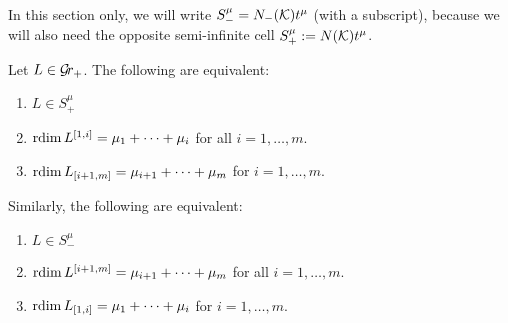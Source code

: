 \documentclass{article} %
\begin{document}
In this section only, we will write $ S^\mu_- = N_-(\mathcal K) t^\mu$ (with a subscript), because we will also need the opposite semi-infinite cell $S^\mu_+ := N(\mathcal K)t^\mu$. %
% 

\begin{lemma} \label{le:Srdim}
    Let $ L \in \mathcal{G}\!r_+$.  The following are equivalent:
    \begin{enumerate}
        \item $ L \in S_+^\mu$ \label{Srdim1}
        \item $ \operatorname{rdim} L^{[1,i]} = \mu_1 + \dots + \mu_i$ for all $ i = 1, \dots, m $. \label{Srdim2} %
        \item $ \operatorname{rdim} L_{[i+1,m]} = \mu_{i+1} + \dots + \mu_m$ for $ i  = 1, \dots, m$. \label{Srdim3} %
    \end{enumerate}
    Similarly, the following are equivalent:
        \begin{enumerate}[label=\arabic*'.]
        \item $ L \in S_-^\mu$
        \item $ \operatorname{rdim} L^{[i+1,m]} = \mu_{i+1} + \dots + \mu_m$ for all $ i = 1, \dots, m $.
        \item $ \operatorname{rdim} L_{[1,i]} = \mu_{1} + \dots + \mu_i$ for $ i  = 1, \dots, m$.
    \end{enumerate}
\end{lemma}
\end{document}
